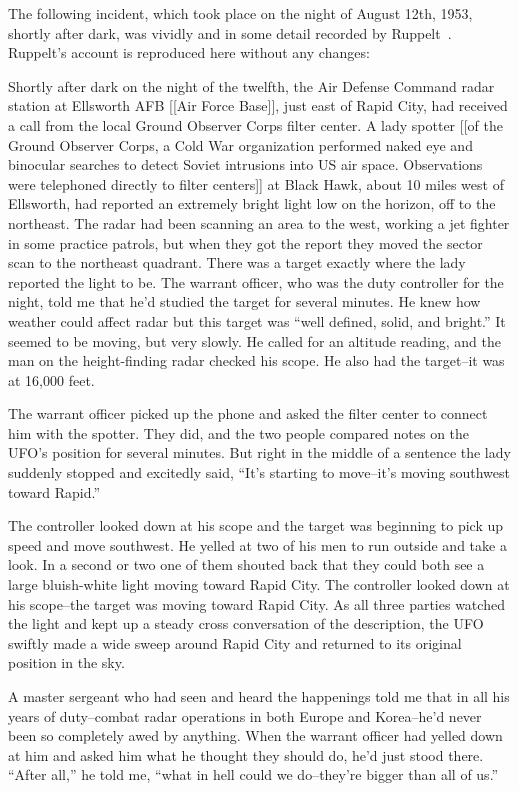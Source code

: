 The following incident, which took place on the night of August 12th, 1953, shortly after dark, was vividly and in some detail recorded by
Ruppelt~\cite{Ruppelt2011May}. Ruppelt's account is reproduced here without any changes:
\begin{svgraybox}
Shortly after dark on the night of the twelfth, the Air Defense
Command radar station at Ellsworth AFB [[Air Force Base]], just east of Rapid City, had
received a call from the local Ground Observer Corps filter center. A
lady spotter [[of the Ground Observer Corps, a Cold War organization performed naked eye and binocular searches to detect Soviet intrusions into US air space. Observations were telephoned directly to filter centers]]
at Black Hawk, about 10 miles west of Ellsworth, had
reported an extremely bright light low on the horizon, off to the
northeast. The radar had been scanning an area to the west, working a
jet fighter in some practice patrols, but when they got the report
they moved the sector scan to the northeast quadrant. There was a
target exactly where the lady reported the light to be. The warrant
officer, who was the duty controller for the night, told me that he'd
studied the target for several minutes. He knew how weather could
affect radar but this target was ``well defined, solid, and bright.''
It seemed to be moving, but very slowly. He called for an altitude
reading, and the man on the height-finding radar checked his scope.
He also had the target--it was at 16,000 feet.

The warrant officer picked up the phone and asked the filter center
to connect him with the spotter. They did, and the two people
compared notes on the UFO's position for several minutes. But right
in the middle of a sentence the lady suddenly stopped and excitedly
said, ``It's starting to move--it's moving southwest toward Rapid.''

The controller looked down at his scope and the target was beginning
to pick up speed and move southwest. He yelled at two of his men to
run outside and take a look. In a second or two one of them shouted
back that they could both see a large bluish-white light moving
toward Rapid City. The controller looked down at his scope--the
target was moving toward Rapid City. As all three parties watched the
light and kept up a steady cross conversation of the description, the
UFO swiftly made a wide sweep around Rapid City and returned to its
original position in the sky.

A master sergeant who had seen and heard the happenings told me that
in all his years of duty--combat radar operations in both Europe and
Korea--he'd never been so completely awed by anything. When the
warrant officer had yelled down at him and asked him what he thought
they should do, he'd just stood there. ``After all,'' he told me, ``what
in hell could we do--they're bigger than all of us.''


\end{svgraybox}
